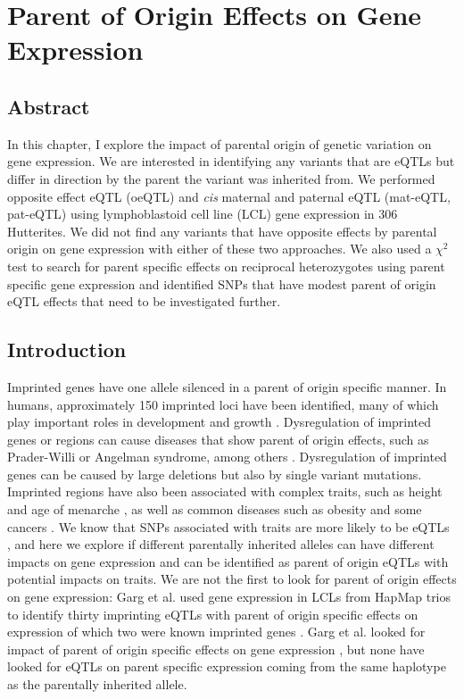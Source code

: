 
\chapter{Parent of Origin Effects on Gene Expression }\label{ch:poeqtl}
\section[Abstract]{Abstract}

In this chapter, I explore the impact of parental origin of genetic variation on gene expression. We are interested in identifying any variants that are eQTLs but differ in direction by the parent the variant was inherited from. We performed opposite effect eQTL (oeQTL) and \emph{cis} maternal and paternal eQTL (mat-eQTL, pat-eQTL) using lymphoblastoid cell line (LCL) gene expression in 306 Hutterites. We did not find any variants that have opposite effects by parental origin on gene expression with either of these two approaches. We also used a $\chi^2$ test to search for parent specific effects on reciprocal heterozygotes using parent specific gene expression and identified SNPs that have modest parent of origin eQTL effects that need to be investigated further.

\section{Introduction}\label{ch04-introduction}
Imprinted genes have one allele silenced in a parent of origin specific manner. In humans, approximately 150 imprinted loci have been identified, many of which play important roles in development and growth \citep{Falls1999,Peters2014,Benonisdottir:2016dz}. Dysregulation of imprinted genes or regions can cause diseases that show parent of origin effects, such as Prader-Willi or Angelman syndrome, among others \cite{Peters2014}. Dysregulation of imprinted genes can be caused by large deletions but also by single variant mutations. Imprinted regions have also been associated with complex traits, such as height and age of menarche \citep{Benonisdottir:2016dz,Zoledziewska:2015do}, as well as common diseases such as obesity and some cancers \citep{Peters2014}. We know that SNPs associated with traits are more likely to be eQTLs \citep{Nicolae2010}, and here we explore if different parentally inherited alleles can have different impacts on gene expression and can be identified as parent of origin eQTLs with potential impacts on traits. We are not the first to look for parent of origin effects on gene expression: Garg et al. used gene expression in LCLs from HapMap trios to identify thirty imprinting eQTLs with parent of origin specific effects on expression of which two were known imprinted genes \citep{Garg2012a}. Garg et al. looked for impact of parent of origin specific effects on gene expression \citep{Garg2012a}, but none have looked for eQTLs on parent specific expression coming from the same haplotype as the parentally inherited allele. 
	
